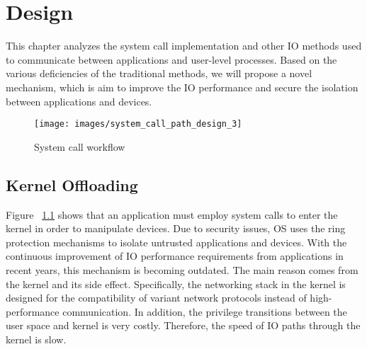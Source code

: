 \chapter{Design}
\label{sec:design}





This chapter analyzes the system call implementation and other 
IO methods used to communicate between applications 
and user-level processes. Based on the various deficiencies of the 
traditional methods, we will propose a novel mechanism, which is aim 
to improve the IO performance and secure the isolation 
between applications and devices.


\begin{figure}[H]
  \centering
  \texttt{[image: images/system\_call\_path\_design\_3]}
  \caption[System call workflow]{System call workflow}
  \label{fig:system_call_path_design_3}
\end{figure}

\section{Kernel Offloading}
Figure ~\ref{fig:system_call_path_design_3} shows that an application must employ system calls to enter the kernel in order to manipulate devices.
Due to security issues, OS uses the ring protection mechanisms\cite{13} to isolate untrusted
applications and devices. 
With the continuous improvement of IO performance requirements 
from applications in recent years, this mechanism is becoming outdated. 
The main reason comes from the kernel and its side effect. Specifically, 
the networking stack in the kernel is designed for the compatibility of 
variant network protocols instead of high-performance communication. 
In addition, the privilege transitions between the user space and kernel 
is very costly. Therefore, the speed of IO paths through the kernel is slow.


